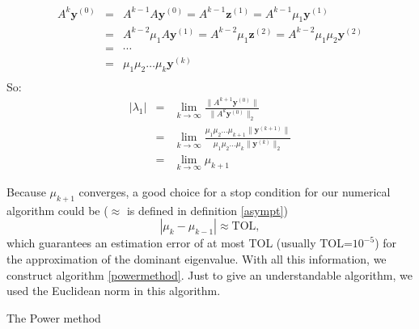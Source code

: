 \documentclass[a4paper,11pt]{report}
\begin{document}
\begin{eqnarray*}
  A^k\mathbf{y}^{(0)} &=& A^{k-1}A \mathbf{y}^{(0)} = A^{k-1}\mathbf{z}^{(1)} =  A^{k-1}\mu_1\mathbf{y}^{(1)}\\
  &=&  A^{k-2}\mu_1A\mathbf{y}^{(1)} = A^{k-2}\mu_1\mathbf{z}^{(2)} = 
  A^{k-2}\mu_1\mu_2\mathbf{y}^{(2)}\\
  &=& \cdots \\
  &=& \mu_1 \mu_2 \ldots \mu_k \mathbf{y}^{(k)}\\
\end{eqnarray*}
So:
\begin{eqnarray}
  |\lambda_1| &=& \lim_{k\to \infty} \frac{\|A^{k+1}\mathbf{y}^{(0)}\|}{\|A^k\mathbf{y}^{(0)}\|_2} \label{powertripke}
\\
&=& \lim_{k\to \infty} \frac{\mu_1\mu_2\ldots \mu_{k+1}\|\mathbf{y}^{(k+1)}\|}{\mu_1 \mu_2 \ldots \mu_k\|\mathbf{y}^{(k)}\|_2}\nonumber\\ 
&=& \lim_{k\to \infty} \mu_{k+1}\nonumber
\end{eqnarray}

Because $\mu_{k+1}$ converges, a good choice for a stop condition for our numerical algorithm could be  
($\approx$ is defined in definition \ref{asympt})
$$|\mu_k - \mu_{k-1}| \approx \text{TOL},$$
which guarantees an estimation error of at most TOL (usually TOL=$10^{-5}$) for the approximation of the dominant eigenvalue. With all this information, we construct algorithm \ref{powermethod}. Just to give an understandable algorithm, we 
used the Euclidean norm in this algorithm.


\begin{algorithm}[H]

 
 \caption{The Power method}\label{powermethod}
\end{algorithm}
\end{document}
